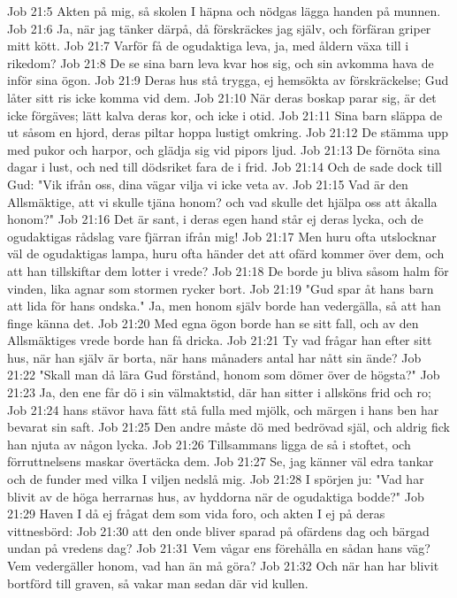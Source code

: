 Job 21:5  Akten på mig, så skolen I häpna och nödgas lägga handen på munnen.
Job 21:6  Ja, när jag tänker därpå, då förskräckes jag själv, och förfäran griper mitt kött.
Job 21:7  Varför få de ogudaktiga leva, ja, med åldern växa till i rikedom?
Job 21:8  De se sina barn leva kvar hos sig, och sin avkomma hava de inför sina ögon.
Job 21:9  Deras hus stå trygga, ej hemsökta av förskräckelse; Gud låter sitt ris icke komma vid dem.
Job 21:10  När deras boskap parar sig, är det icke förgäves; lätt kalva deras kor, och icke i otid.
Job 21:11  Sina barn släppa de ut såsom en hjord, deras piltar hoppa lustigt omkring.
Job 21:12  De stämma upp med pukor och harpor, och glädja sig vid pipors ljud.
Job 21:13  De förnöta sina dagar i lust, och ned till dödsriket fara de i frid.
Job 21:14  Och de sade dock till Gud: "Vik ifrån oss, dina vägar vilja vi icke veta av.
Job 21:15  Vad är den Allsmäktige, att vi skulle tjäna honom? och vad skulle det hjälpa oss att åkalla honom?"
Job 21:16  Det är sant, i deras egen hand står ej deras lycka, och de ogudaktigas rådslag vare fjärran ifrån mig!
Job 21:17  Men huru ofta utslocknar väl de ogudaktigas lampa, huru ofta händer det att ofärd kommer över dem, och att han tillskiftar dem lotter i vrede?
Job 21:18  De borde ju bliva såsom halm för vinden, lika agnar som stormen rycker bort.
Job 21:19  "Gud spar åt hans barn att lida för hans ondska." Ja, men honom själv borde han vedergälla, så att han finge känna det.
Job 21:20  Med egna ögon borde han se sitt fall, och av den Allsmäktiges vrede borde han få dricka.
Job 21:21  Ty vad frågar han efter sitt hus, när han själv är borta, när hans månaders antal har nått sin ände?
Job 21:22  "Skall man då lära Gud förstånd, honom som dömer över de högsta?"
Job 21:23  Ja, den ene får dö i sin välmaktstid, där han sitter i allsköns frid och ro;
Job 21:24  hans stävor hava fått stå fulla med mjölk, och märgen i hans ben har bevarat sin saft.
Job 21:25  Den andre måste dö med bedrövad själ, och aldrig fick han njuta av någon lycka.
Job 21:26  Tillsammans ligga de så i stoftet, och förruttnelsens maskar övertäcka dem.
Job 21:27  Se, jag känner väl edra tankar och de funder med vilka I viljen nedslå mig.
Job 21:28  I spörjen ju: "Vad har blivit av de höga herrarnas hus, av hyddorna när de ogudaktiga bodde?"
Job 21:29  Haven I då ej frågat dem som vida foro, och akten I ej på deras vittnesbörd:
Job 21:30  att den onde bliver sparad på ofärdens dag och bärgad undan på vredens dag?
Job 21:31  Vem vågar ens förehålla en sådan hans väg? Vem vedergäller honom, vad han än må göra?
Job 21:32  Och när han har blivit bortförd till graven, så vakar man sedan där vid kullen.
